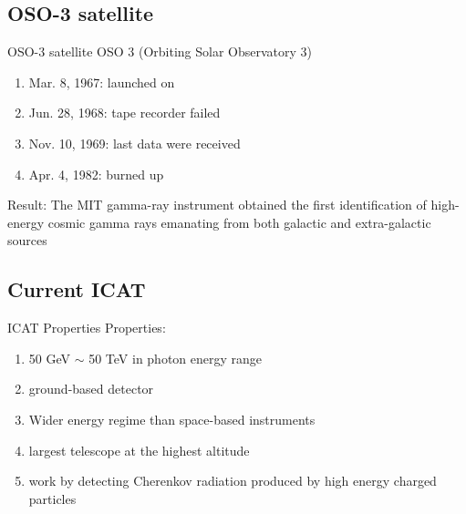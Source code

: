 \documentclass{beamer}
\begin{document}
\subsection{OSO-3 satellite}
\begin{frame}{OSO-3 satellite}
	OSO 3 (Orbiting Solar Observatory 3)
	\begin{enumerate}
		\item Mar. 8, 1967: launched on
		\item Jun. 28, 1968: tape recorder failed
		\item Nov. 10, 1969: last data were received
		\item Apr. 4, 1982: burned up
	\end{enumerate}
	Result:
	\newline
	The MIT gamma-ray instrument obtained the first identification of high-energy cosmic gamma rays emanating from both galactic and extra-galactic sources
\end{frame}



\subsection{Current ICAT}
\begin{frame}{ICAT Properties}
	Properties:
	\begin{enumerate}
		\item 50 GeV $\sim$ 50 TeV in photon energy range
		\item ground-based detector
		\item Wider energy regime than space-based instruments
		\item largest telescope at the highest altitude
		\item work by detecting Cherenkov radiation produced by high energy charged particles
	\end{enumerate}
\end{frame}
\end{document}
